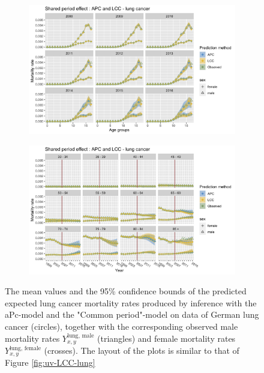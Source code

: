 \begin{figure}
    \centering
    \begin{subfigure}[b]{.75\linewidth}
        \includegraphics[width=\linewidth]{real-data/real-data-multivariate/Figures/multivariate-comparison-by-age-lung.png}
    \end{subfigure}
    
    \begin{subfigure}[b]{.75\linewidth}
        \includegraphics[width=\linewidth]{real-data/real-data-multivariate/Figures/multivariate-comparison-by-period-lung.png}
    \end{subfigure}
    \caption{The mean values and the 95\% confidence bounds of the predicted expected lung cancer mortality rates produced by inference with the aPc-model and the "Common period"-model on data of German lung cancer (circles), together with the corresponding observed male mortality rates $Y_{x,y}^{\text{lung, male}}$ (triangles) and female mortality rates $Y_{x,y}^{\text{lung, female}}$ (crosses). The layout of the plots is similar to that of Figure \ref{fig:uv-LCC-lung}}
    \label{fig:mv-APC-LCC-lung}
\end{figure}

